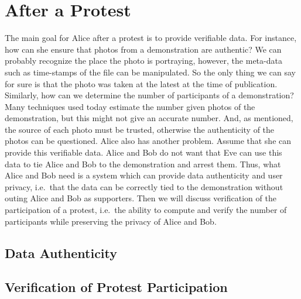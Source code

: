 \section{After a Protest}
\label{AfterProtest}

The main goal for Alice after a protest is to provide verifiable data.
For instance, how can she ensure that photos from a demonstration are 
authentic?
We can probably recognize the place the photo is portraying, however, the 
meta-data such as time-stamps of the file can be manipulated.
So the only thing we can say for sure is that the photo was taken at the latest 
at the time of publication.
Similarly, how can we determine the number of participants of a demonstration?
Many techniques used today estimate the number given photos of the 
demonstration, but this might not give an accurate number.
And, as mentioned, the source of each photo must be trusted, otherwise the 
authenticity of the photos can be questioned.
Alice also has another problem.
Assume that she can provide this verifiable data.
Alice and Bob do not want that Eve can use this data to tie Alice
and Bob to the demonstration and arrest them.
Thus, what Alice and Bob need is a system which can provide data authenticity 
and user privacy, i.e.\ that the data can be correctly tied to the 
demonstration without outing Alice and Bob as supporters.
Then we will discuss verification of the participation of a protest, i.e.\ the 
ability to compute and verify the number of participants while preserving the 
privacy of Alice and Bob.

  
\subsection{Data Authenticity}
\label{DataAuthenticity}



\subsection{Verification of Protest Participation}
\label{ProtestVerif}


